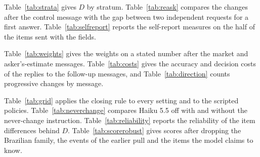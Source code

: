 \documentclass[11pt]{article}
\begin{document}




\clearpage

Table~\ref{tab:strata} gives $D$ by stratum. Table~\ref{tab:reask} compares the changes after the control message with the gap between two independent requests for a first answer. Table~\ref{tab:selfreport} reports the self-report measures on the half of the items sent with the fields.





\clearpage

Table~\ref{tab:weights} gives the weights on a stated number after the market and asker's-estimate messages. Table~\ref{tab:costs} gives the accuracy and decision costs of the replies to the follow-up messages, and Table~\ref{tab:direction} counts progressive changes by message.





\clearpage

Table~\ref{tab:grid} applies the closing rule to every setting and to the scripted policies. Table~\ref{tab:neverchange} compares Haiku 5.5 off with and without the never-change instruction. Table~\ref{tab:reliability} reports the reliability of the item differences behind $D$. Table~\ref{tab:scorerobust} gives scores after dropping the Brazilian family, the events of the earlier pull and the items the model claims to know.





\end{document}
